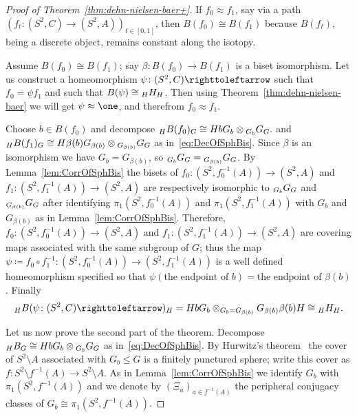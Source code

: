 \documentclass{amsart}
\begin{document}
\begin{proof}[Proof of Theorem~\ref{thm:dehn-nielsen-baer+}]
  If $f_0\approx f_1$, say via a path
  $(f_t\colon (S^2,C)\to (S^2,A))_{t\in [0,1]}$, then
  $B(f_0)\cong B(f_1)$ because $B(f_t)$, being a discrete object,
  remains constant along the isotopy.
  
  Assume $B(f_0)\cong B(f_1)$; say $\beta\colon B(f_0)\to B(f_1)$ is a
  biset isomorphism. Let us construct a homeomorphism
  $\psi \colon (S^2,C)\selfmap$ such that $f_0=\psi f_1$ and such that
  $B(\psi)\cong \subscript H H_H$. Then using
  Theorem~\ref{thm:dehn-nielsen-baer} we will get $\psi\approx \one$,
  and therefrom $f_0\approx f_1$.
  
  Choose $b\in B(f_0)$ and decompose
  $\subscript H B(f_0)_{G} \cong H b G_b \otimes \subscript{G_b}G_G.$
  and
  $\subscript H B(f_1)_{G} \cong H \beta(b) G_{\beta(b)} \otimes
  \subscript{G_{\beta(b)}}G_G$ as in~\eqref{eq:DecOfSphBis}. Since
  $\beta$ is an isomorphism we have $G_{b}=G_{\beta(b)}$, so
  $\subscript{G_{b}}G_G = \subscript{G_{\beta(b)}}G_G$.  By
  Lemma~\ref{lem:CorrOfSphBis} the bisets of
  $f_0\colon (S^2,f_0^{-1}(A))\to (S^2,A)$ and
  $f_1\colon (S^2,f_1^{-1}(A))\to (S^2,A)$ are respectively isomorphic
  to $\subscript{G_{b}}G_G$ and $ \subscript{G_{\beta(b)}}G_G$ after
  identifying $\pi_1(S^2,f_0^{-1}(A))$ and $\pi_1(S^2,f_1^{-1}(A))$
  with $G_{b}$ and $G_{\beta(b)}$ as in
  Lemma~\ref{lem:CorrOfSphBis}. Therefore,
  $f_0\colon (S^2,f_0^{-1}(A))\to (S^2,A)$ and
  $f_1\colon (S^2,f_1^{-1}(A))\to (S^2,A)$ are covering maps
  associated with the same subgroup of $G$; thus the map
  $\psi\coloneqq f_0\circ f_1^{-1}\colon (S^2,f_0^{-1}(A))\to
  (S^2,f_1^{-1}(A))$ is a well defined homeomorphism specified so that
  $\psi(\text{the endpoint of }b)=\text{the endpoint of
  }\beta(b)$. Finally
  \[\subscript H B(\psi \colon (S^2,C)\selfmap)_H
    =H b G_{b}\otimes_{G_b=G_{\beta(b)}} G_{\beta(b)} \beta(b) H\cong
    \subscript H H_H.\]

  Let us now prove the second part of the theorem. Decompose
  $\subscript H B_{G} \cong H b G_b \otimes \subscript{G_b}G_G$ as
  in~\eqref{eq:DecOfSphBis}. By Hurwitz's
  theorem~\cite{hurwitz:ramifiedsurfaces} the cover of
  $S^2\setminus A$ associated with $G_b\le G$ is a finitely punctured
  sphere; write this cover as
  $f\colon S^2\setminus f^{-1}(A) \to S^2\setminus A$. As in
  Lemma~\ref{lem:CorrOfSphBis} we identify $G_b$ with
  $\pi_1(S^2,f^{-1}(A))$ and we denote by $(\Xi_a)_{a\in f^{-1}(A)}$
  the peripheral conjugacy classes of $G_b\cong \pi_1(S^2,f^{-1}(A)).$


\end{proof}
\end{document}
